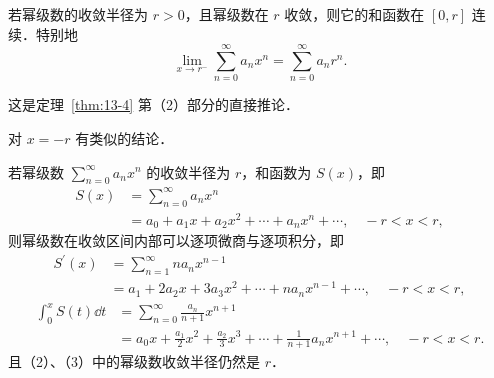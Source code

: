 \begin{corollary}\label{cor:13-2-2}
若幂级数的收敛半径为 $r>0$，且幂级数在 $r$ 收敛，则它的和函数在 $[0,r]$ 连续．特别地
\[
\lim_{x\to r^{-}}\sum_{n=0}^{\infty}a_{n}x^{n}=\sum_{n=0}^{\infty}a_{n}r^{n}.
\]
\end{corollary}

这是定理~\ref{thm:13-4} 第（2）部分的直接推论．

对 $x=-r$ 有类似的结论．

\begin{theorem}\label{thm:13-5}
若幂级数 $\displaystyle\sum_{n=0}^{\infty}a_{n}x^{n}$ 的收敛半径为 $r$，和函数为 $S(x)$，即
\begin{equation}
\begin{aligned}
S(x)&=\sum_{n=0}^{\infty}a_{n}x^{n}\\
&=a_{0}+a_{1}x+a_{2}x^{2}+\cdots+a_{n}x^{n}+\cdots,\quad -r<x<r,
\end{aligned}
\tag{1}
\end{equation}
则幂级数在收敛区间内部可以逐项微商与逐项积分，即
\begin{equation}
\begin{aligned}
S^{\prime}(x)&=\sum_{n=1}^{\infty}na_{n}x^{n-1}\\
&=a_{1}+2a_{2}x+3a_{3}x^{2}+\cdots+na_{n}x^{n-1}+\cdots,\quad -r<x<r,
\end{aligned}
\tag{2}
\end{equation}
\begin{equation}
\begin{aligned}
\int_{0}^{x}S(t)\dd t&=\sum_{n=0}^{\infty}\frac{a_{n}}{n+1}x^{n+1}\\
&=a_{0}x+\frac{a_{1}}{2}x^{2}+\frac{a_{2}}{3}x^{3}+\cdots+\frac{1}{n+1}a_{n}x^{n+1}+\cdots,\quad -r<x<r.
\end{aligned}
\tag{3}
\end{equation}
且（2）、（3）中的幂级数收敛半径仍然是 $r$．
\end{theorem}

